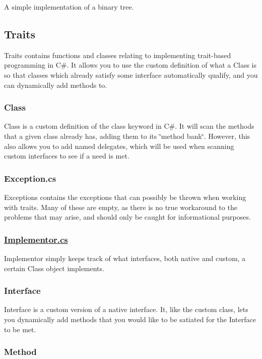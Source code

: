 A simple implementation of a binary tree.

\subsection*{Traits}

Traits contains functions and classes relating to implementing trait-\/based programming in C\#. It allows you to use the custom definition of what a Class is so that classes which already satisfy some interface automatically qualify, and you can dynamically add methods to.

\subsubsection*{Class}

Class is a custom definition of the {\ttfamily class} keyword in C\#. It will scan the methods that a given class already has, adding them to its \char`\"{}method bank\char`\"{}. However, this also allows you to add named delegates, which will be used when scanning custom interfaces to see if a need is met.

\subsubsection*{Exception.\+cs}

Exceptions contains the exceptions that can possibly be thrown when working with traits. Many of these are empty, as there is no true workaround to the problems that may arise, and should only be caught for informational purposes.

\subsubsection*{\hyperlink{Implementor_8cs_source}{Implementor.\+cs}}

Implementor simply keeps track of what interfaces, both native and custom, a certain Class object implements.

\subsubsection*{Interface}

Interface is a custom version of a native {\ttfamily interface}. It, like the custom class, lets you dynamically add methods that you would like to be satiated for the Interface to be met.

\subsubsection*{Method}

